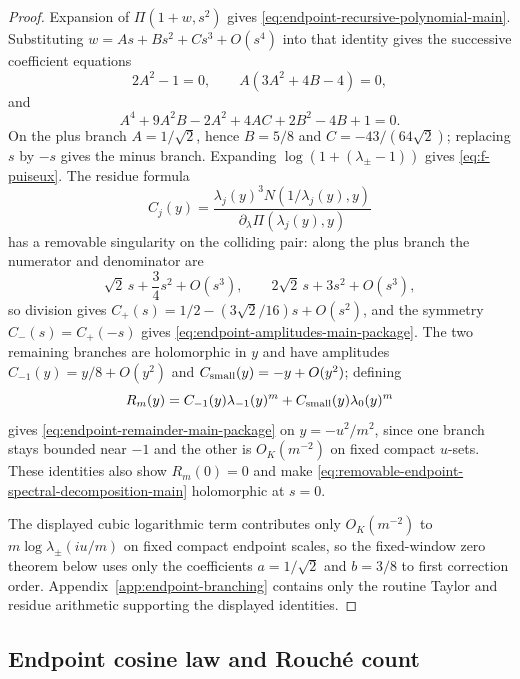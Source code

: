 \begin{proof}
Expansion of $\Pi(1+w,s^2)$ gives \eqref{eq:endpoint-recursive-polynomial-main}.  Substituting $w=As+Bs^2+Cs^3+O(s^4)$ into that identity gives the successive coefficient equations
\[
2A^2-1=0,
\qquad
A(3A^2+4B-4)=0,
\]
and
\[
A^4+9A^2B-2A^2+4AC+2B^2-4B+1=0.
\]
On the plus branch $A=1/\sqrt2$, hence $B=5/8$ and $C=-43/(64\sqrt2)$; replacing $s$ by $-s$ gives the minus branch.  Expanding $\log(1+(\lambda_\pm-1))$ gives \eqref{eq:f-puiseux}.  The residue formula
\[
C_j(y)=\frac{\lambda_j(y)^3N(1/\lambda_j(y),y)}{\partial_\lambda\Pi(\lambda_j(y),y)}
\]
has a removable singularity on the colliding pair: along the plus branch the numerator and denominator are
\[
\sqrt2\,s+\frac34s^2+O(s^3),
\qquad
2\sqrt2\,s+3s^2+O(s^3),
\]
so division gives $C_+(s)=1/2-(3\sqrt2/16)s+O(s^2)$, and the symmetry $C_-(s)=C_+(-s)$ gives \eqref{eq:endpoint-amplitudes-main-package}.  The two remaining branches are holomorphic in $y$ and have amplitudes $C_{-1}(y)=y/8+O(y^2)$ and $C_{\rm small}(y)=-y+O(y^2)$; defining
\[
R_m(y)=C_{-1}(y)\lambda_{-1}(y)^m+C_{\rm small}(y)\lambda_0(y)^m
\]
gives \eqref{eq:endpoint-remainder-main-package} on $y=-u^2/m^2$, since one branch stays bounded near $-1$ and the other is $O_K(m^{-2})$ on fixed compact $u$-sets.  These identities also show $R_m(0)=0$ and make \eqref{eq:removable-endpoint-spectral-decomposition-main} holomorphic at $s=0$.

The displayed cubic logarithmic term contributes only $O_K(m^{-2})$ to $m\log\lambda_\pm(iu/m)$ on fixed compact endpoint scales, so the fixed-window zero theorem below uses only the coefficients $a=1/\sqrt2$ and $b=3/8$ to first correction order.  Appendix~\ref{app:endpoint-branching} contains only the routine Taylor and residue arithmetic supporting the displayed identities.
\end{proof}

\subsection{Endpoint cosine law and Rouch\'e count}\label{subsec:endpoint-quantization}

